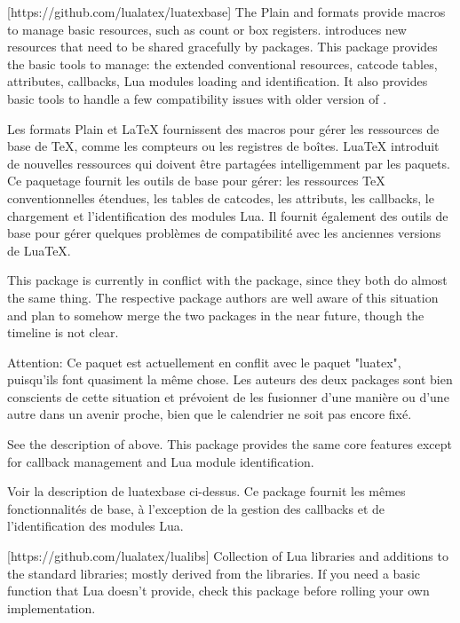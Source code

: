 \documentclass{lltxdoc}
\begin{document}
[https://github.com/lualatex/luatexbase]
The Plain and \latex formats provide macros to manage \tex basic resources,
such as count or box registers. \luatex introduces new resources that need to
be shared gracefully by packages. This package provides the basic tools to
manage: the extended conventional \tex resources, catcode tables, attributes,
callbacks, Lua modules loading and identification. It also provides basic
tools to handle a few compatibility issues with older version of \luatex.

Les formats Plain et LaTeX fournissent des macros pour gérer les ressources de base de TeX, comme les compteurs ou les registres de boîtes. LuaTeX introduit de nouvelles ressources qui doivent être partagées intelligemment par les paquets. Ce paquetage fournit les outils de base pour gérer: les ressources TeX conventionnelles étendues, les tables de catcodes, les attributs, les callbacks, le chargement et l'identification des modules Lua. Il fournit également des outils de base pour gérer quelques problèmes de compatibilité avec les anciennes versions de LuaTeX.

 This package is currently in conflict with the 
package, since they both do almost the same thing. The respective package
authors are well aware of this situation and plan to somehow merge the two
packages in the near future, though the timeline is not clear.

Attention: Ce paquet est actuellement en conflit avec le paquet "luatex", puisqu'ils font quasiment la même chose. Les auteurs des deux packages sont bien conscients de cette situation et prévoient de les fusionner d'une manière ou d'une autre dans un avenir proche, bien que le calendrier ne soit pas encore fixé.

See the description of  above. This package provides the same
core features except for callback management and Lua module identification.

Voir la description de luatexbase ci-dessus. Ce package fournit les mêmes fonctionnalités de base, à l'exception de la gestion des callbacks et de l'identification des modules Lua.

[https://github.com/lualatex/lualibs]
Collection of Lua libraries and additions to the standard libraries; mostly
derived from the \context libraries. If you need a basic function that Lua
doesn't provide, check this package before rolling your own implementation.
\end{document}
